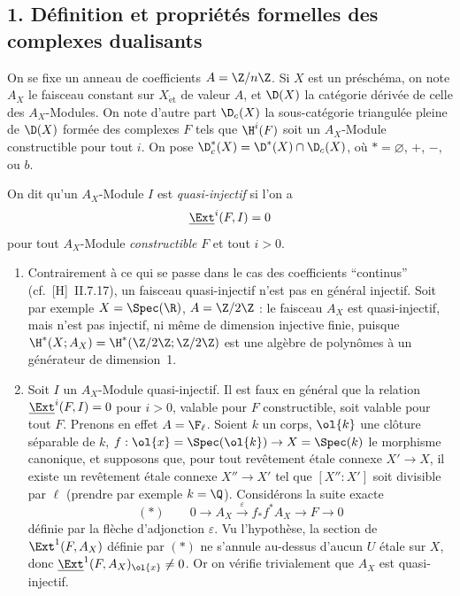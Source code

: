 \subsection{1. Définition et propriétés formelles des complexes dualisants}

On se fixe un anneau de coefficients $A = \Z/n\Z$. Si $X$ est un préschéma, on note $A_X$ le faisceau constant sur $X_{\mathrm{\acute{e}t}}$ de valeur $A$, et $\D(X)$ la catégorie dérivée de celle des $A_X$-Modules. On note d'autre part $\D_c(X)$ la sous-catégorie triangulée pleine de $\D(X)$ formée des complexes $F$ tels que $\H^i(F)$ soit un $A_X$-Module constructible pour tout $i$. On pose $\D_c^{*}(X) = \D^{*}(X) \cap \D_c(X)$, où $* = \varnothing$, $+$, $-$, ou $b$.

\begin{definition}
On dit qu'un $A_X$-Module $I$ est \emph{quasi-injectif} si l'on a
\[
\underline{\Ext}^i(F,I) = 0
\]
pour tout $A_X$-Module \emph{constructible} $F$ et tout $i > 0$.
\end{definition}

\begin{remark}
\begin{enumerate}
\item[a)] Contrairement à ce qui se passe dans le cas des coefficients ``continus'' (cf.~[H]~II.7.17), un faisceau quasi-injectif n'est pas en général injectif. Soit par exemple $X = \Spec(\R)$, $A = \Z/2\Z$ : le faisceau $A_X$ est quasi-injectif, mais n'est pas injectif, ni même de dimension injective finie, puisque $\H^{*}(X; A_X) = \H^{*}(\Z/2\Z; \Z/2\Z)$ est une algèbre de polynômes à un générateur de dimension~1.

\item[b)] Soit $I$ un $A_X$-Module quasi-injectif. Il est faux en général que la relation $\underline{\Ext}^i(F,I) = 0$ pour $i > 0$, valable pour $F$ constructible, soit valable pour tout $F$. Prenons en effet $A = \F_{\ell}$. Soient $k$ un corps, $\ol{k}$ une clôture séparable de $k$, $f : \ol{x} = \Spec(\ol{k}) \to X = \Spec(k)$ le morphisme canonique, et supposons que, pour tout revêtement étale connexe $X' \to X$, il existe un revêtement étale connexe $X'' \to X'$ tel que $[X'':X']$ soit divisible par $\ell$ (prendre par exemple $k = \Q$). Considérons la suite exacte
\[
(*) \qquad 0 \longrightarrow A_X \xrightarrow{\;\varepsilon\;} f_{*}f^{*}A_X \longrightarrow F \longrightarrow 0
\]
définie par la flèche d'adjonction $\varepsilon$. Vu l'hypothèse, la section de $\Ext^1(F,A_X)$ définie par $(*)$ ne s'annule au-dessus d'aucun $U$ étale sur $X$, donc $\underline{\Ext}^1(F,A_X)_{\ol{x}} \neq 0$. Or on vérifie trivialement que $A_X$ est quasi-injectif.
\end{enumerate}
\end{remark}

